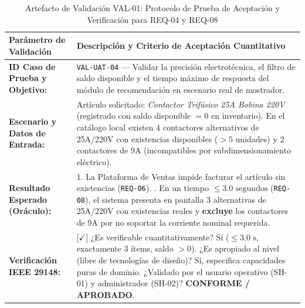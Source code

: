 \begin{table}[htbp]
	\centering
	\scriptsize
	\caption{Artefacto de Validación VAL-01: Protocolo de Prueba de Aceptación y Verificación para REQ-04 y REQ-08}
	\label{tab:artefacto_validacion}
	\begin{tabularx}{\textwidth}{>{\raggedright\arraybackslash}p{} Y}
		\toprule
		\textbf{Parámetro de Validación} & \textbf{Descripción y Criterio de Aceptación Cuantitativo} \\
		\midrule
		\textbf{ID Caso de Prueba y Objetivo:} & \texttt{VAL-UAT-04} --- Validar la precisión electrotécnica, el filtro de saldo disponible y el tiempo máximo de respuesta del módulo de recomendación en escenario real de mostrador. \\
		\textbf{Escenario y Datos de Entrada:} & Artículo solicitado: \textit{Contactor Trifásico 25A Bobina 220V} (registrado con saldo disponible $= 0$ en inventario). En el catálogo local existen 4 contactores alternativos de 25A/220V con existencias disponibles ($> 5$ unidades) y 2 contactores de 9A (incompatibles por subdimensionamiento eléctrico). \\
		\textbf{Resultado Esperado (Oráculo):} & 1. La Plataforma de Ventas impide facturar el artículo sin existencias (\texttt{REQ-06}). . En un tiempo $\le 3.0\text{ segundos}$ (\texttt{REQ-08}), el sistema presenta en pantalla 3 alternativas de 25A/220V con existencias reales y \textbf{excluye} los contactores de 9A por no soportar la corriente nominal requerida. \\
		\textbf{Verificación IEEE 29148:} & [$\checkmark$] ¿Es verificable cuantitativamente? Sí ($\le 3.0\text{ s}$, exactamente 3 ítems, saldo $>0$). \newline
		[$\checkmark$] ¿Es apropiado al nivel (libre de tecnologías de diseño)? Sí, especifica capacidades puras de dominio. \newline
		[$\checkmark$] ¿Validado por el usuario operativo (SH-01) y administrador (SH-02)? \textbf{CONFORME / APROBADO}. \\
		\bottomrule
	\end{tabularx}
\end{table}
